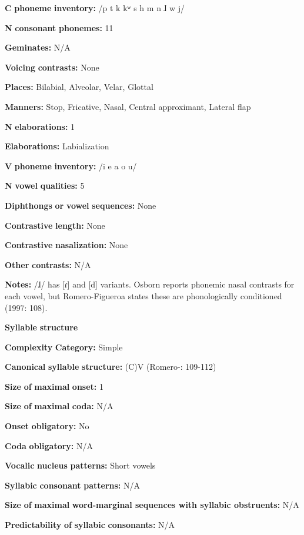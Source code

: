 \textbf{C} \textbf{phoneme} \textbf{inventory:} /p t k kʷ s h m n ɺ w j/

\textbf{N} \textbf{consonant} \textbf{phonemes:} 11

\textbf{Geminates:} N/A

\textbf{Voicing} \textbf{contrasts:} None

\textbf{Places:} Bilabial, Alveolar, Velar, Glottal

\textbf{Manners:} Stop, Fricative, Nasal, Central approximant, Lateral flap

\textbf{N} \textbf{elaborations:} 1

\textbf{Elaborations:} Labialization

\textbf{V} \textbf{phoneme} \textbf{inventory:} /i e a o u/

\textbf{N} \textbf{vowel} \textbf{qualities:} 5

\textbf{Diphthongs} \textbf{or} \textbf{vowel} \textbf{sequences:} None

\textbf{Contrastive} \textbf{length:} None

\textbf{Contrastive} \textbf{nasalization:} None

\textbf{Other} \textbf{contrasts:} N/A

\textbf{Notes:} /ɺ/ has [ɾ] and [d] variants. Osborn reports phonemic nasal contrasts for each vowel, but Romero-Figueroa states these are phonologically conditioned (1997: 108).

\textbf{Syllable} \textbf{structure}

\textbf{Complexity} \textbf{Category:} Simple

\textbf{Canonical} \textbf{syllable} \textbf{structure:} (C)V (Romero-\citealt{Figeroa1997}: 109-112)

\textbf{Size} \textbf{of} \textbf{maximal} \textbf{onset:} 1

\textbf{Size} \textbf{of} \textbf{maximal} \textbf{coda:} N/A

\textbf{Onset} \textbf{obligatory:} No

\textbf{Coda} \textbf{obligatory:} N/A

\textbf{Vocalic} \textbf{nucleus} \textbf{patterns:} Short vowels

\textbf{Syllabic} \textbf{consonant} \textbf{patterns:} N/A

\textbf{Size} \textbf{of} \textbf{maximal} \textbf{word{}-marginal sequences with syllabic obstruents:} N/A

\textbf{Predictability} \textbf{of} \textbf{syllabic} \textbf{consonants:} N/A

